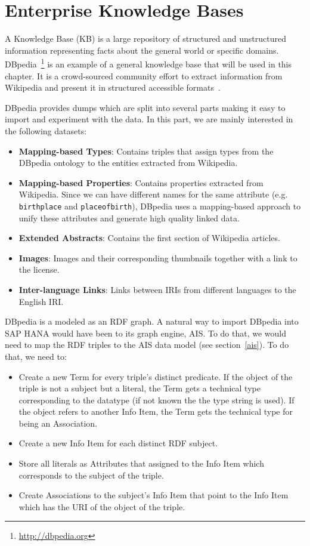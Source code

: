 
\section{Enterprise Knowledge Bases}

A Knowledge Base (KB) is a large repository of structured and unstructured information representing facts about the general world or specific domains. DBpedia~\footnote{\url{http://dbpedia.org}} is an example of a general knowledge base that will be used in this chapter. It is a crowd-sourced community effort to extract information from Wikipedia and present it in structured accessible formats~\cite{Bizer:WebSemJorunal:09}.

DBpedia provides dumps which are split into several parts making it easy to import and experiment with the data. In this part, we are mainly interested in the following datasets:

\begin{itemize}
	\item \textbf{Mapping-based Types}: Contains triples that assign types from the DBpedia ontology to the entities extracted from Wikipedia.
	\item \textbf{Mapping-based Properties}: Contains properties extracted from Wikipedia. Since we can have different names for the same attribute (e.g. \texttt{birthplace} and \texttt{placeofbirth}), DBpedia uses a mapping-based approach to unify these attributes and generate high quality linked data.
	\item \textbf{Extended Abstracts}: Contains the first section of Wikipedia articles.
	\item \textbf{Images}: Images and their corresponding thumbnails together with a link to the license.
	\item \textbf{Inter-language Links}: Links between IRIs from different languages to the English IRI.
\end{itemize}

DBpedia is a modeled as an RDF graph. A natural way to import DBpedia into SAP HANA would have been to its graph engine, AIS. To do that, we would need to map the RDF triples to the AIS data model (see section~\ref{ais}). To do that, we need to:

\begin{itemize}
	\item Create a new Term for every triple's distinct predicate. If the object of the triple is not a subject but a literal, the Term gets a technical type corresponding to the datatype (if not known the the type string is used). If the object refers to another Info Item, the Term gets the technical type for being an Association.
	\item Create a new Info Item for each distinct RDF subject.
	\item Store all literals as Attributes that assigned to the Info Item which corresponds to the subject of the triple.
	\item Create Associations to the subject's Info Item that point to the Info Item which has the URI of the object of the triple.
\end{itemize}

